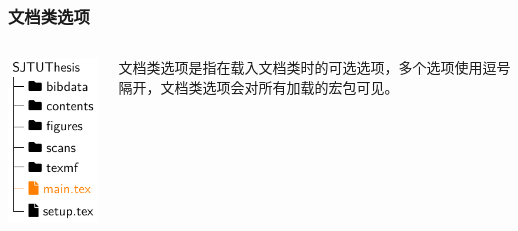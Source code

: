 \begin{frame}[fragile]
  \frametitle{文档类选项}
  \begin{columns}
    \begin{column}{0.35\textwidth}
      \includegraphics[page=1]{support/figures/thesisdir.pdf}
    \end{column}
    \begin{column}{0.65\textwidth}
      文档类选项是指在载入文档类时的可选选项，多个选项使用逗号隔开，文档类选项会对所有加载的宏包可见。
    \end{column}
  \end{columns}
\end{frame}

